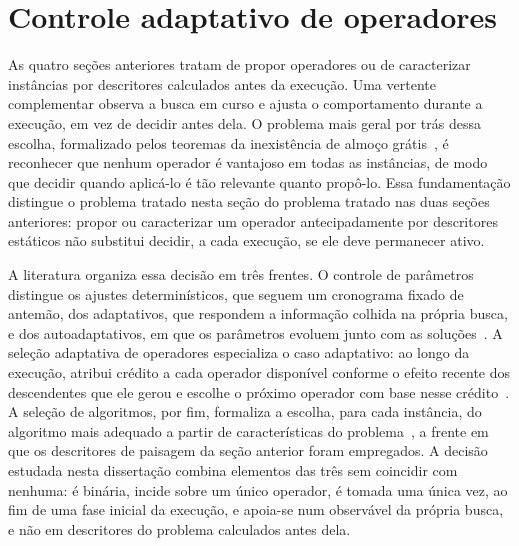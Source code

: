 \section{Controle adaptativo de operadores}

As quatro seções anteriores tratam de propor operadores ou de caracterizar instâncias por descritores calculados antes da execução. Uma vertente complementar observa a busca em curso e ajusta o comportamento durante a execução, em vez de decidir antes dela. O problema mais geral por trás dessa escolha, formalizado pelos teoremas da inexistência de almoço grátis~\cite{wolpert1997no}, é reconhecer que nenhum operador é vantajoso em todas as instâncias, de modo que decidir quando aplicá-lo é tão relevante quanto propô-lo. Essa fundamentação distingue o problema tratado nesta seção do problema tratado nas duas seções anteriores: propor ou caracterizar um operador antecipadamente por descritores estáticos não substitui decidir, a cada execução, se ele deve permanecer ativo.

A literatura organiza essa decisão em três frentes. O controle de parâmetros distingue os ajustes determinísticos, que seguem um cronograma fixado de antemão, dos adaptativos, que respondem a informação colhida na própria busca, e dos autoadaptativos, em que os parâmetros evoluem junto com as soluções~\cite{eiben1999parameter}. A seleção adaptativa de operadores especializa o caso adaptativo: ao longo da execução, atribui crédito a cada operador disponível conforme o efeito recente dos descendentes que ele gerou e escolhe o próximo operador com base nesse crédito~\cite{fialho2008adaptive,maturana2009adaptive}. A seleção de algoritmos, por fim, formaliza a escolha, para cada instância, do algoritmo mais adequado a partir de características do problema~\cite{rice1976algorithm}, a frente em que os descritores de paisagem da seção anterior foram empregados. A decisão estudada nesta dissertação combina elementos das três sem coincidir com nenhuma: é binária, incide sobre um único operador, é tomada uma única vez, ao fim de uma fase inicial da execução, e apoia-se num observável da própria busca, e não em descritores do problema calculados antes dela.
